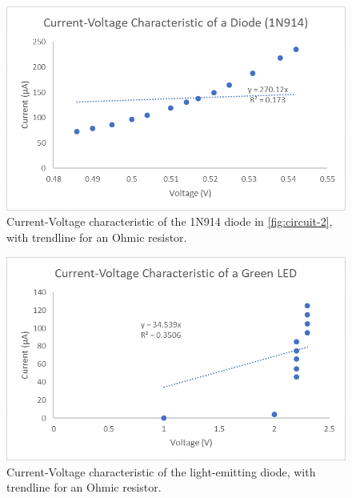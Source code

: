 \documentclass[a4paper, 11pt]{article}
\begin{document}
        \begin{figure}[H]
            \centering
            \includegraphics{PH425-Lab1-2b-R.png}
            \caption{Current-Voltage characteristic of the 1N914 diode in \ref{fig:circuit-2}, with trendline for an Ohmic resistor.}
            \label{fig:results-2b}
        \end{figure}

        \begin{figure}[H]
            \centering
            \includegraphics{PH425-Lab1-2c-R.png}
            \caption{Current-Voltage characteristic of the light-emitting diode, with trendline for an Ohmic resistor.}
            \label{fig:results-2c}
        \end{figure}

        
\end{document}
